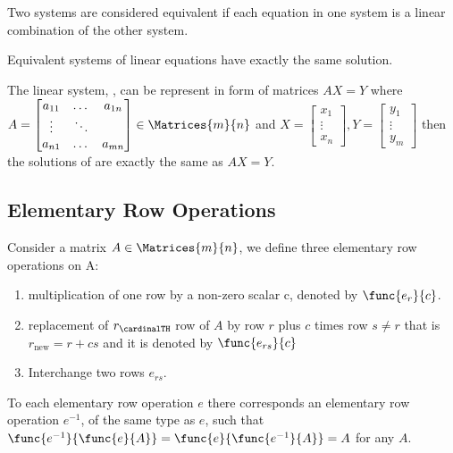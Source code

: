 \begin{definition}
    Two systems are considered equivalent if each equation in one system is a linear combination of the other system.
\end{definition}

\begin{proposition}
    Equivalent systems of linear equations have exactly the same solution.
\end{proposition}

The linear system, , can be represent in form of matrices \(AX = Y\) where \linebreak\({A = \begin{bmatrix}
            a_{11} & \dots  & a_{1n} \\
            \vdots & \ddots &        \\
            a_{n1} & \dots  & a_{mn}
        \end{bmatrix} \in \Matrices{m}{n}}\)
and \(X = \begin{bmatrix}
    x_1    \\
    \vdots \\
    x_n
\end{bmatrix} , Y = \begin{bmatrix}
    y_1    \\
    \vdots \\
    y_m
\end{bmatrix}\)
then the solutions of  are exactly the same as \(AX = Y\).

\subsection{Elementary Row Operations}

Consider a matrix \(A \in \Matrices{m}{n}\), we define three elementary row operations on A:
\begin{enumerate}
    \item multiplication of one row by a non-zero scalar c, denoted by \(\func{e_r}{c}\).
    \item replacement of \(r_\cardinalTH\) row of \(A\) by row \(r\) plus \(c\) times row \(s \neq r\) that is \(r_{\text{new}} = r + cs\) and it is denoted by \(\func{e_{rs}}{c}\)
    \item Interchange two rows \(e_{rs}\).
\end{enumerate}

\begin{theorem}
    To each elementary row operation \(e\) there corresponds an elementary row operation \(e^{-1}\), of the same type as \(e\), such that \(\func{e^{-1}}{\func{e}{A}} = \func{e}{\func{e^{-1}}{A}} = A\) for any \(A\).
\end{theorem}

